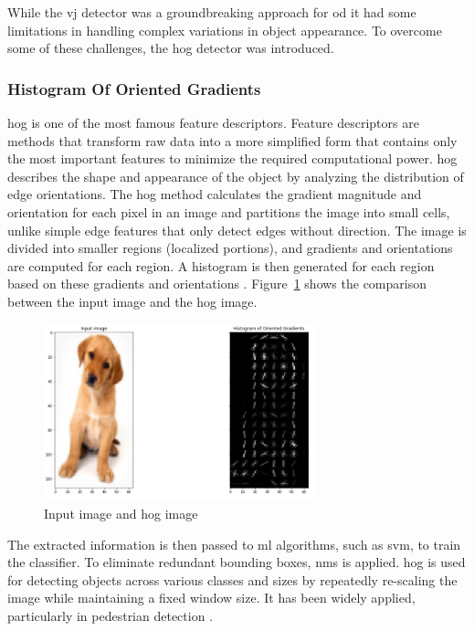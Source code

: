 While the \gls{vj} detector was a groundbreaking approach for \gls{od} it had some limitations in handling complex variations in object appearance. To overcome some of these challenges, the \gls{hog} detector was introduced.

\subsubsection{Histogram Of Oriented Gradients}
 \gls{hog} is one of the most famous feature descriptors. Feature descriptors are methods that transform raw data into a more simplified form that contains only the most important features to minimize the required computational power. \gls{hog} describes the shape and appearance of the object by analyzing the distribution of edge orientations. The \gls{hog} method calculates the gradient magnitude and orientation for each pixel in an image and partitions the image into small cells, unlike simple edge features that only detect edges without direction. The image is divided into smaller regions (localized portions), and gradients and orientations are computed for each region. A histogram is then generated for each region based on these gradients and orientations \cite{HOG}. Figure~\ref{HOG_image} shows the comparison between the input image and the \gls{hog} image.
 
\begin{figure}[ht]
    \centering
    \includegraphics[width=0.7\textwidth]{Figures/HOG_Histogram_image.PNG} 
    \caption{Input image and \gls{hog} image \cite{HOG}}
    \label{HOG_image}
\end{figure}

The extracted information is then passed to \gls{ml} algorithms, such as \gls{svm}, to train the classifier. To eliminate redundant bounding boxes, \gls{nms} is applied. \gls{hog} is used for detecting objects across various classes and sizes by repeatedly re-scaling the image while maintaining a fixed window size. It has been widely applied, particularly in pedestrian detection \cite{oD_Review}.

